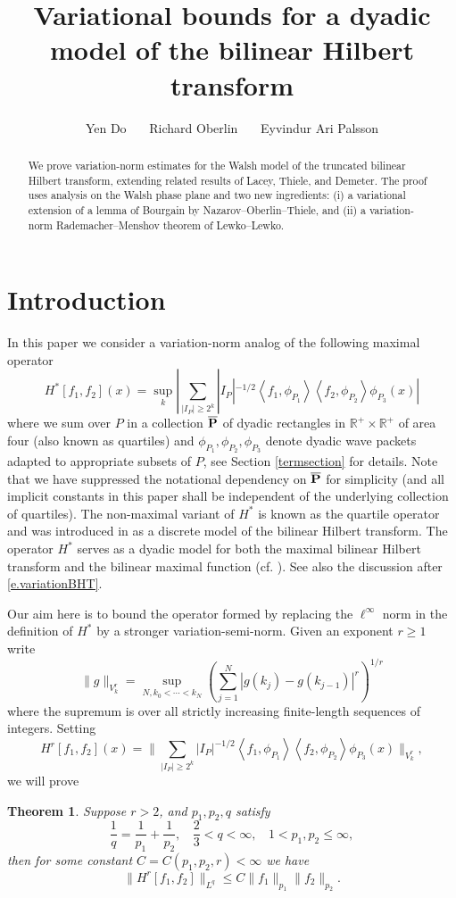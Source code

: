 \documentclass[12pt]{amsart}
\title[Variational bounds for the quartile operator]{Variational bounds for a dyadic model of the bilinear Hilbert transform}
\author[Y. Do, \ \ R. Oberlin, \ \  E. A. Palsson]
{Yen Do \ \ \ Richard Oberlin \ \ \ Eyvindur Ari Palsson}
\numberwithin{equation}{section}
\def\P{{\bf P}}
\def\<{\left<}
\def\>{\right>}
\newcommand {\ov}{\overline}
\newtheorem{theorem}{Theorem}[section]
\begin{document}
\begin{abstract}{We prove variation-norm estimates for the Walsh model of the truncated bilinear Hilbert transform, extending related results of Lacey, Thiele, and Demeter. The proof uses analysis on the Walsh phase plane and two new ingredients: (i) a variational extension of a lemma of Bourgain by Nazarov--Oberlin--Thiele, and (ii) a variation-norm Rademacher--Menshov theorem of Lewko--Lewko.}
\end{abstract}

\maketitle

\section{Introduction}
In this paper we consider a variation-norm analog of the following maximal operator
\[
H^*[f_1,f_2](x) = \sup_k |\sum_{|I_P| \geq 2^k} |I_P|^{-1/2}\<f_1,\phi_{P_1}\>\<f_2,\phi_{P_2}\>\phi_{P_3}(x)|
\]
where we sum over $P$ in a collection $\ov{\P}$ of dyadic rectangles in $\mathbb R^+ \times \mathbb R^+$ of area four (also known as quartiles) and $\phi_{P_1},\phi_{P_2},\phi_{P_3}$ denote dyadic wave packets adapted to appropriate subsets of $P$, see Section \ref{termsection} for details. Note that we have suppressed the notational dependency on $\ov{\P}$ for simplicity (and all implicit constants in this paper shall be independent of the underlying collection of quartiles). The non-maximal variant of $H^*$ is known as the quartile operator and was introduced in \cite{thiele95tfa} as a discrete model of the bilinear Hilbert transform. The operator $H^*$ serves as a dyadic model for both the maximal bilinear Hilbert transform and the bilinear maximal function \cite{lacey00bmf} (cf. \cite{thiele01mqo, demeter07pce}). See also the discussion after \eqref{e.variationBHT}.

Our aim here is to bound the operator formed by replacing the $\ell^{\infty}$ norm in the definition of $H^*$ by a stronger variation-semi-norm. Given an exponent $r \geq 1$ write
\[
\|g\|_{V^r_k} = \sup_{N, k_0 < \cdots < k_N} (\sum_{j = 1}^N|g(k_j) - g(k_{j-1})|^r)^{1/r}
\]
where the supremum is over all strictly increasing finite-length sequences of integers. Setting
\[
H^r[f_1,f_2](x) = \|\sum_{|I_P| \geq 2^k} |I_P|^{-1/2}\<f_1,\phi_{P_1}\>\<f_2,\phi_{P_2}\>\phi_{P_3}(x)\|_{V^r_k},
\]
we will prove
\begin{theorem} \label{maintheorem} Suppose $r > 2$, and $p_1, p_2, q$ satisfy
\[
\frac{1}{q} = \frac{1}{p_1} + \frac{1}{p_2}, \ \ \ \ \frac{2}{3} < q < \infty, \ \ \ \ 1 < p_1, p_2 \le \infty,
\] 
then for some constant $C=C(p_1,p_2,r)<\infty$ we have
\begin{equation} \label{maintheoremeq}
\|H^r[f_1,f_2]\|_{L^q} \leq C \|f_1\|_{p_1} \|f_2\|_{p_2}.
\end{equation}
\end{theorem}
\end{document}

